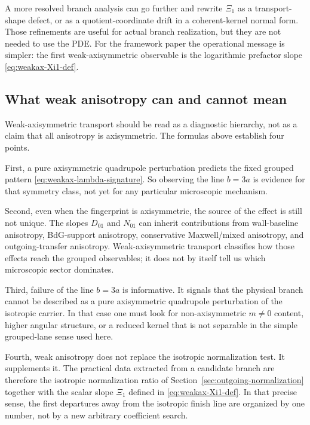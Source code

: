 \documentclass[11pt]{article}
\theoremstyle{definition}
\newcommand{\XiOne}{\ensuremath{\Xi_1}}
\begin{document}
A more resolved branch analysis can go further and rewrite $\XiOne$ as a transport-shape defect, or as a quotient-coordinate drift in a coherent-kernel normal form. Those refinements are useful for actual branch realization, but they are not needed to use the PDE. For the framework paper the operational message is simpler: the first weak-axisymmetric observable is the logarithmic prefactor slope \eqref{eq:weakax-Xi1-def}.

\subsection{What weak anisotropy can and cannot mean}

Weak-axisymmetric transport should be read as a diagnostic hierarchy, not as a claim that all anisotropy is axisymmetric. The formulas above establish four points.

First, a pure axisymmetric quadrupole perturbation predicts the fixed grouped pattern \eqref{eq:weakax-lambda-signature}. So observing the line $b=3a$ is evidence for that symmetry class, not yet for any particular microscopic mechanism.

Second, even when the fingerprint is axisymmetric, the source of the effect is still not unique. The slopes $D_{01}$ and $N_{01}$ can inherit contributions from wall-baseline anisotropy, BdG-support anisotropy, conservative Maxwell/mixed anisotropy, and outgoing-transfer anisotropy. Weak-axisymmetric transport classifies how those effects reach the grouped observables; it does not by itself tell us which microscopic sector dominates.

Third, failure of the line $b=3a$ is informative. It signals that the physical branch cannot be described as a pure axisymmetric quadrupole perturbation of the isotropic carrier. In that case one must look for non-axisymmetric $m\neq 0$ content, higher angular structure, or a reduced kernel that is not separable in the simple grouped-lane sense used here.

Fourth, weak anisotropy does not replace the isotropic normalization test. It supplements it. The practical data extracted from a candidate branch are therefore the isotropic normalization ratio of Section~\ref{sec:outgoing-normalization} together with the scalar slope $\XiOne$ defined in \eqref{eq:weakax-Xi1-def}. In that precise sense, the first departures away from the isotropic finish line are organized by one number, not by a new arbitrary coefficient search.

\end{document}
